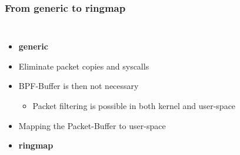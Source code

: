 \begin{frame}
\frametitle{From generic to ringmap}
\begin{columns}
\vspace{-1em}
\begin{itemize}
	\item<1->\textbf{generic}
	\item<2->Eliminate packet copies  and syscalls
	\item<3->BPF-Buffer is then not necessary
		\begin{itemize}
			\item<3->Packet filtering is possible in both kernel and 
				user-space
		\end{itemize}
	\item<4->Mapping the Packet-Buffer to user-space
	\item<5->[$\Rightarrow$]\textbf{ringmap}
\end{itemize}
\vspace{-2em}

\end{columns}
\end{frame}
